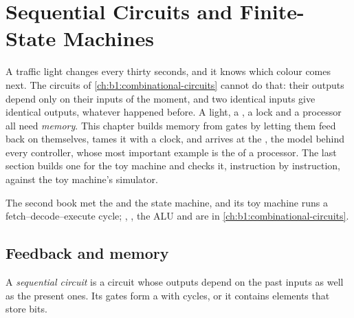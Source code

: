 \chapter{Sequential Circuits and Finite-State Machines}\label{ch:b1:sequential-circuits}

A traffic light changes every thirty seconds, and it knows which colour comes next. The circuits of
\cref{ch:b1:combinational-circuits} cannot do that: their outputs depend only on their inputs of the moment, and two
identical inputs give identical outputs, whatever happened before. A light, a , a lock and a processor all need
\emph{memory}. This chapter builds memory from gates by letting them feed back on themselves, tames it with a clock,
and arrives at the , the model behind every controller, whose most important example is the  of a processor. The last section builds one for the toy machine and checks it, instruction by instruction, against
the toy machine's simulator.

\begin{recall}
The second book met the  and the state machine, and its toy machine runs a fetch--decode--execute cycle;
, , the ALU and  are in \cref{ch:b1:combinational-circuits}.
\end{recall}

\section{Feedback and memory}\label{sec:b1:sequential-circuits:feedback}

\begin{definition}\label{def:b1:sequential-circuits:sequential}
A \emph{sequential circuit} is a circuit whose outputs depend on the past inputs as well as the
present ones. Its gates form a  with cycles, or it contains elements that store bits.
\end{definition}


